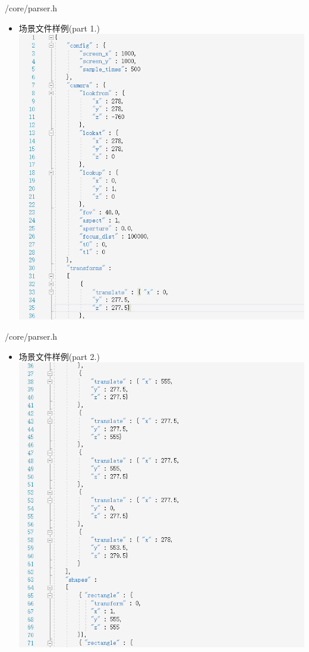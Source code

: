 \documentclass{beamer}
\begin{document}
\begin{frame} {/core/parser.h}
\begin{itemize}
\item
场景文件样例(part 1.) \\ 
\includegraphics[scale=0.3]{code1}
\end{itemize}
\end{frame}

\begin{frame} {/core/parser.h}
\begin{itemize}
\item
场景文件样例(part 2.) \\ 
\includegraphics[scale=0.3]{code2}
\end{itemize}
\end{frame}
\end{document}
